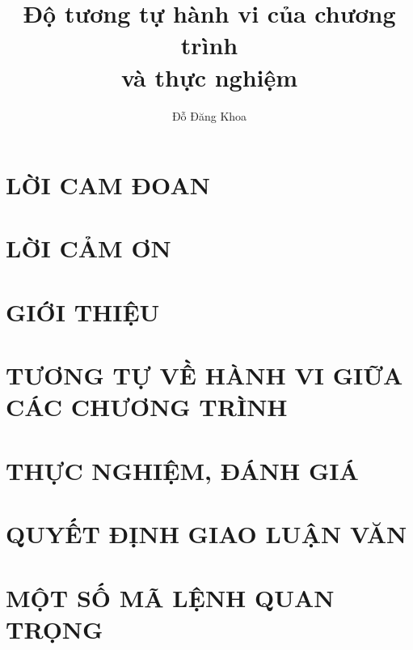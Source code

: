 \documentclass[12pt, oneside ]{memoir}
\title{Độ tương tự hành vi của chương trình \\ và thực nghiệm}
\author{Đỗ Đăng Khoa}
\begin{document}

\chapter*{LỜI CAM ĐOAN}

\chapter*{LỜI CẢM ƠN}

\newpage
\tableofcontents

\newpage
\chapter{GIỚI THIỆU}


\chapter{TƯƠNG TỰ VỀ HÀNH VI GIỮA CÁC CHƯƠNG TRÌNH}


\chapter{THỰC NGHIỆM, ĐÁNH GIÁ}




\chapter{QUYẾT ĐỊNH GIAO LUẬN VĂN}


\chapter{MỘT SỐ MÃ LỆNH QUAN TRỌNG}

\end{document}
